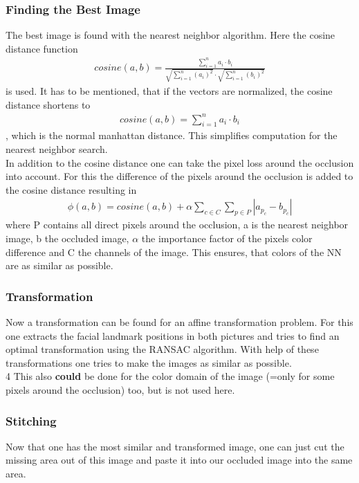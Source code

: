 \documentclass[
     11pt,         %
     a4paper,      %
     oneside,
     ]{article}
\begin{document}
\subsubsection{Finding the Best Image}
The best image is found with the nearest neighbor algorithm. Here the cosine distance function
\begin{align*}
  cosine(a,b) = \frac{\sum^n_{i=1} a_i \cdot b_i}{ \sqrt{\sum^n_{i=1} (a_i)^2} \cdot \sqrt{\sum^n_{i=1} (b_i)^2} }
\end{align*}
is used. It has to be mentioned, that if the vectors are normalized, the cosine distance shortens to
\begin{align*}
  cosine(a,b) = \sum^n_{i=1} a_i \cdot b_i
\end{align*}
, which is the normal manhattan distance. This simplifies computation for the nearest neighbor search. \\
In addition to the cosine distance one can take the pixel loss around the occlusion into account. For this the difference of the pixels around the occlusion is added to the cosine distance resulting in
\begin{align*}
  \phi(a,b)=cosine(a,b)+ \alpha \sum_{c \in C} \sum_{p \in P} |a_{p_c}-b_{p_c}|
\end{align*}
where P contains all direct pixels around the occlusion, a is the nearest neighbor image, b the occluded image, $\alpha$ the importance factor of the pixels color difference and C the channels of the image. This ensures, that colors of the NN are as similar as possible.

\subsubsection{Transformation}
Now a transformation can be found for an affine transformation problem. For this one extracts the facial landmark positions in both pictures and tries to find an optimal transformation using the RANSAC algorithm. With help of these transformations one tries to make the images as similar as possible.\\4
This also \textbf{could} be done for the color domain of the image (=only for some pixels around the occlusion) too, but is not used here.

\subsubsection{Stitching}
Now that one has the most similar and transformed image, one can just cut the missing area out of this image and paste it into our occluded image into the same area.
\end{document}
